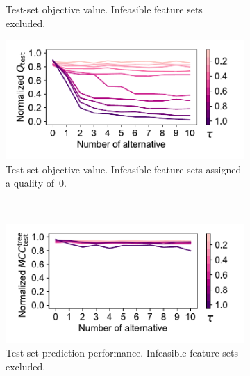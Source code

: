 \documentclass[iicol, sn-basic, Numbered]{sn-jnl} %
\theoremstyle{plain}
\theoremstyle{definition}
\begin{document}
\begin{figure}[t]
\begin{subfigure}[t]{0.49\textwidth}
		\caption{
			Test-set objective value.
			Infeasible feature sets excluded.
		}
		\label{fig:afs:impact-num-alternatives-tau-test-objective-max}
	\end{subfigure}
	\hfill
	\begin{subfigure}[t]{0.49\textwidth}
		\centering
		\includegraphics[width=\textwidth, trim=15 15 20 10, clip]{plots/afs-impact-num-alternatives-tau-test-objective-max-fillna.pdf}
		\caption{
			Test-set objective value.
			Infeasible feature sets assigned a quality of~0.
		}
		\label{fig:afs:impact-num-alternatives-tau-test-objective-max-fillna}
	\end{subfigure}
	\\
	\begin{subfigure}[t]{0.49\textwidth}
		\centering
		\includegraphics[width=\textwidth, trim=15 15 20 10, clip]{plots/afs-impact-num-alternatives-tau-decision-tree-test-mcc-max.pdf}
		\caption{
			Test-set prediction performance.
			Infeasible feature sets excluded.
		}
		\label{fig:afs:impact-num-alternatives-tau-decision-tree-test-mcc-max}
	\end{subfigure}
	\hfill
	\begin{subfigure}[t]{0.49\textwidth}
		\centering

\end{subfigure}
\end{figure}
\end{document}
